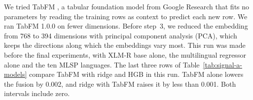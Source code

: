 \documentclass[11pt]{article}
\begin{document}
We tried TabFM \citep{kong-etal-2026-tabfm}, a tabular foundation model from Google Research that fits no parameters by reading
the training rows as context to predict each new row. We ran TabFM 1.0.0 on fewer dimensions. Before %
step~3, we reduced the embedding from 768 to 394 dimensions with principal component analysis (PCA),
which keeps the directions along which the embeddings vary most. This run was made before the final %
experiments, with XLM-R base alone, the multilingual regressor alone and the ten MLSP languages. The
last three rows of Table~\ref{tab:signal-a-models} compare TabFM with ridge and HGB in this run.
TabFM alone lowers the fusion by 0.002, and ridge with TabFM raises it by less than 0.001. Both %
intervals include zero.
\end{document}

